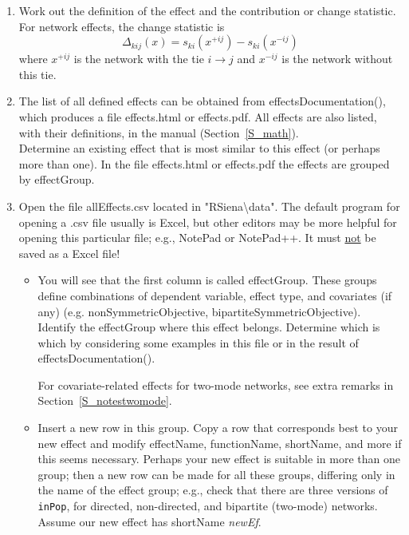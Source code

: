 \documentclass[a4paper,fleqn,11pt]{article}
\newcommand{\+}{\, + \,}
\newcommand{\sfn}[1]{\textsf{#1}}
\begin{document}
\begin{enumerate}

\item Work out the definition of the effect and the contribution or
      change statistic.
      For network effects, the change statistic is
      \begin{equation}
      \Delta_{kij} (x) =  s_{ki}(x^{+ij}) -     s_{ki}(x^{-ij})  \label{changestat}
      \end{equation}
      where $x^{+ij}$ is the network with the tie $i \rightarrow j$
      and $x^{-ij}$ is the network without this tie.
\item The list of all defined effects can be obtained from \textsf{effectsDocumentation()},
      which produces a file \textsf{effects.html} or \textsf{effects.pdf}.
      All effects are also listed, with their definitions, in the manual (Section~\ref{S_math}). \\
      Determine an existing effect that is most similar
      to this effect (or perhaps more than one).
      In the file \textsf{effects.html} or \textsf{effects.pdf} the effects are grouped
      by \sfn{effectGroup}.
\item Open the file \textsf{allEffects.csv} located in
       \textsf{"RSiena\textbackslash data"}. The default program for opening a .csv file
       usually is Excel, but other editors may be more helpful
       for opening this particular file; e.g., NotePad or NotePad++.
       It must \underline{not} be saved as a Excel file!
	   \begin{itemize}
		\item You will see that the first column is called \sfn{effectGroup}.
              These groups define combinations of dependent variable, effect type,
              and covariates (if any)
              (e.g. nonSymmetricObjective,  bipartiteSymmetricObjective).
              Identify the effectGroup where this effect belongs.
              Determine which is which by considering some examples
              in this file or in the result of \sfn{effectsDocumentation()}.

              For covariate-related effects for two-mode networks, see
              extra remarks in Section~\ref{S_notestwomode}.
    	\item Insert a new row in this group.
              Copy a row that corresponds best to your new effect
              and modify effectName, functionName, shortName,
              and more if this seems necessary.
              Perhaps your new effect is suitable in more than one group;
              then a new row can be made for all these groups, differing only
              in the name of the effect group; e.g., check that there are
              three versions of \texttt{inPop}, for directed, non-directed,
              and bipartite (two-mode) networks.
              Assume our new effect has shortName \textit{newEf}.


\end{itemize}
\end{enumerate}
\end{document}
